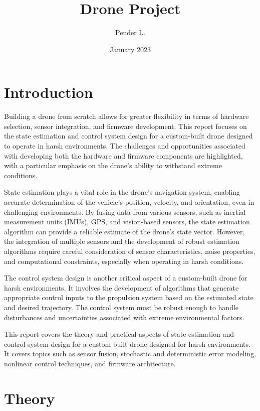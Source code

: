 \documentclass{article}
\begin{document}
\title{Drone Project}
\author{Pender L.}
\date{January 2023}
\maketitle


\section{Introduction}

Building a drone from scratch allows for greater flexibility in terms of hardware selection, sensor integration, and firmware development. This report focuses on the state estimation and control system design for a custom-built drone designed to operate in harsh environments. The challenges and opportunities associated with developing both the hardware and firmware components are highlighted, with a particular emphasis on the drone's ability to withstand extreme conditions.

State estimation plays a vital role in the drone's navigation system, enabling accurate determination of the vehicle's position, velocity, and orientation, even in challenging environments. By fusing data from various sensors, such as inertial measurement units (IMUs), GPS, and vision-based sensors, the state estimation algorithm can provide a reliable estimate of the drone's state vector. However, the integration of multiple sensors and the development of robust estimation algorithms require careful consideration of sensor characteristics, noise properties, and computational constraints, especially when operating in harsh conditions.

The control system design is another critical aspect of a custom-built drone for harsh environments. It involves the development of algorithms that generate appropriate control inputs to the propulsion system based on the estimated state and desired trajectory. The control system must be robust enough to handle disturbances and uncertainties associated with extreme environmental factors.

This report covers the theory and practical aspects of state estimation and control system design for a custom-built drone designed for harsh environments. It covers topics such as sensor fusion, stochastic and deterministic error modeling, nonlinear control techniques, and firmware architecture.


\section{Theory}
\end{document}
